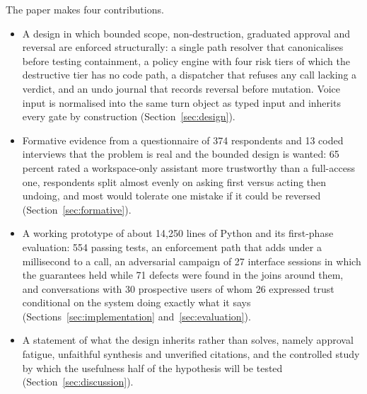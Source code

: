 The paper makes four contributions.
\begin{itemize}
  \item A design in which bounded scope, non-destruction, graduated approval and reversal are enforced structurally: a single path resolver that canonicalises before testing containment, a policy engine with four risk tiers of which the destructive tier has no code path, a dispatcher that refuses any call lacking a verdict, and an undo journal that records reversal before mutation. Voice input is normalised into the same turn object as typed input and inherits every gate by construction (Section~\ref{sec:design}).
  \item Formative evidence from a questionnaire of 374 respondents and 13 coded interviews that the problem is real and the bounded design is wanted: 65 percent rated a workspace-only assistant more trustworthy than a full-access one, respondents split almost evenly on asking first versus acting then undoing, and most would tolerate one mistake if it could be reversed (Section~\ref{sec:formative}).
  \item A working prototype of about 14,250 lines of Python and its first-phase evaluation: 554 passing tests, an enforcement path that adds under a millisecond to a call, an adversarial campaign of 27 interface sessions in which the guarantees held while 71 defects were found in the joins around them, and conversations with 30 prospective users of whom 26 expressed trust conditional on the system doing exactly what it says (Sections~\ref{sec:implementation} and~\ref{sec:evaluation}).
  \item A statement of what the design inherits rather than solves, namely approval fatigue, unfaithful synthesis and unverified citations, and the controlled study by which the usefulness half of the hypothesis will be tested (Section~\ref{sec:discussion}).
\end{itemize}

